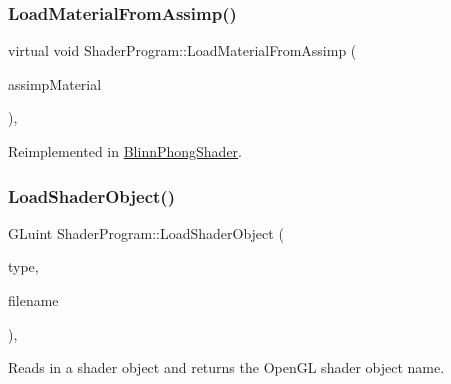 \hypertarget{class_shader_program_a51ac6fbf3a3d88643eef303a4c3a1fa8}{}\label{class_shader_program_a51ac6fbf3a3d88643eef303a4c3a1fa8} 
\subsubsection{\texorpdfstring{Load\+Material\+From\+Assimp()}{LoadMaterialFromAssimp()}}
{\footnotesize\ttfamily virtual void Shader\+Program\+::\+Load\+Material\+From\+Assimp (\begin{DoxyParamCaption}\item[{std\+::shared\+\_\+ptr$<$ struct ai\+Material $>$}]{assimp\+Material }\end{DoxyParamCaption})\hspace{0.3cm}{\ttfamily [inline]}, {\ttfamily [virtual]}}



Reimplemented in \hyperlink{class_blinn_phong_shader_a5a2a720a403f3d005b07a96fee35b95b}{Blinn\+Phong\+Shader}.

\hypertarget{class_shader_program_ab5c50c33203cf65b7f6ffe00d2243d5a}{}\label{class_shader_program_ab5c50c33203cf65b7f6ffe00d2243d5a} 
\subsubsection{\texorpdfstring{Load\+Shader\+Object()}{LoadShaderObject()}}
{\footnotesize\ttfamily G\+Luint Shader\+Program\+::\+Load\+Shader\+Object (\begin{DoxyParamCaption}\item[{G\+Lenum}]{type,  }\item[{const std\+::string \&}]{filename }\end{DoxyParamCaption})\hspace{0.3cm}{\ttfamily [static]}, {\ttfamily [protected]}}



Reads in a shader object and returns the Open\+GL shader object name. 


